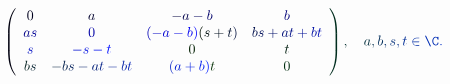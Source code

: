 \documentclass[12pt]{article}
\begin{document}
\makeatletter
\renewcommand*{\@textcolor}[3]{%
  \protect\leavevmode
  \begingroup
    \color#1{#2}#3%
  \endgroup
}
\makeatother
\begin{displaymath}
\mathcolor[RGB]{0,0,15}{\left(} \begin{array} {cccc} { \mathcolor[RGB]{0,0,30}{0} } & { \mathcolor[RGB]{0,0,45}{a} } & { \mathcolor[RGB]{0,0,60}{-} \mathcolor[RGB]{0,0,75}{a} \mathcolor[RGB]{0,0,90}{-} \mathcolor[RGB]{0,0,105}{b} } & { \mathcolor[RGB]{0,0,120}{b} } \\ { \mathcolor[RGB]{0,0,135}{a} \mathcolor[RGB]{0,0,150}{s} } & { \mathcolor[RGB]{0,0,165}{0} } & { \mathcolor[RGB]{0,0,180}{(} \mathcolor[RGB]{0,0,195}{-} \mathcolor[RGB]{0,0,210}{a} \mathcolor[RGB]{0,0,225}{-} \mathcolor[RGB]{0,0,240}{b} \mathcolor[RGB]{0,0,255}{)} \mathcolor[RGB]{0,15,0}{(} \mathcolor[RGB]{0,15,15}{s} \mathcolor[RGB]{0,15,30}{+} \mathcolor[RGB]{0,15,45}{t} \mathcolor[RGB]{0,15,60}{)} } & { \mathcolor[RGB]{0,15,75}{b} \mathcolor[RGB]{0,15,90}{s} \mathcolor[RGB]{0,15,105}{+} \mathcolor[RGB]{0,15,120}{a} \mathcolor[RGB]{0,15,135}{t} \mathcolor[RGB]{0,15,150}{+} \mathcolor[RGB]{0,15,165}{b} \mathcolor[RGB]{0,15,180}{t} } \\ { \mathcolor[RGB]{0,15,195}{s} } & { \mathcolor[RGB]{0,15,210}{-} \mathcolor[RGB]{0,15,225}{s} \mathcolor[RGB]{0,15,240}{-} \mathcolor[RGB]{0,15,255}{t} } & { \mathcolor[RGB]{0,30,0}{0} } & { \mathcolor[RGB]{0,30,15}{t} } \\ { \mathcolor[RGB]{0,30,30}{b} \mathcolor[RGB]{0,30,45}{s} } & { \mathcolor[RGB]{0,30,60}{-} \mathcolor[RGB]{0,30,75}{b} \mathcolor[RGB]{0,30,90}{s} \mathcolor[RGB]{0,30,105}{-} \mathcolor[RGB]{0,30,120}{a} \mathcolor[RGB]{0,30,135}{t} \mathcolor[RGB]{0,30,150}{-} \mathcolor[RGB]{0,30,165}{b} \mathcolor[RGB]{0,30,180}{t} } & { \mathcolor[RGB]{0,30,195}{(} \mathcolor[RGB]{0,30,210}{a} \mathcolor[RGB]{0,30,225}{+} \mathcolor[RGB]{0,30,240}{b} \mathcolor[RGB]{0,30,255}{)} \mathcolor[RGB]{0,45,0}{t} } & { \mathcolor[RGB]{0,45,15}{0} } \end{array} \mathcolor[RGB]{0,45,30}{\right)} \mathcolor[RGB]{0,45,45}{,} \quad \mathcolor[RGB]{0,45,60}{a} \mathcolor[RGB]{0,45,75}{,} \mathcolor[RGB]{0,45,90}{b} \mathcolor[RGB]{0,45,105}{,} \mathcolor[RGB]{0,45,120}{s} \mathcolor[RGB]{0,45,135}{,} \mathcolor[RGB]{0,45,150}{t} \mathcolor[RGB]{0,45,165}{\in} \mathcolor[RGB]{0,45,180}{\C} \mathcolor[RGB]{0,45,195}{.}
\end{displaymath}
\end{document}
